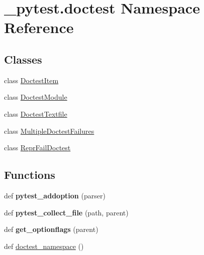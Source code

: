 \hypertarget{namespace__pytest_1_1doctest}{}\section{\+\_\+pytest.\+doctest Namespace Reference}
\label{namespace__pytest_1_1doctest}
\subsection*{Classes}
\begin{DoxyCompactItemize}
\item 
class \hyperlink{class__pytest_1_1doctest_1_1_doctest_item}{Doctest\+Item}
\item 
class \hyperlink{class__pytest_1_1doctest_1_1_doctest_module}{Doctest\+Module}
\item 
class \hyperlink{class__pytest_1_1doctest_1_1_doctest_textfile}{Doctest\+Textfile}
\item 
class \hyperlink{class__pytest_1_1doctest_1_1_multiple_doctest_failures}{Multiple\+Doctest\+Failures}
\item 
class \hyperlink{class__pytest_1_1doctest_1_1_repr_fail_doctest}{Repr\+Fail\+Doctest}
\end{DoxyCompactItemize}
\subsection*{Functions}
\begin{DoxyCompactItemize}
\item 
\mbox{\label{namespace__pytest_1_1doctest_a033cf61ee7c1c00bf68e10e290868006}} 
def {\bfseries pytest\+\_\+addoption} (parser)
\item 
\mbox{\label{namespace__pytest_1_1doctest_ad0bbd0800646e5b301ed36044b3e6a9b}} 
def {\bfseries pytest\+\_\+collect\+\_\+file} (path, parent)
\item 
\mbox{\label{namespace__pytest_1_1doctest_ac79ad01bec1de8666bdc2f46a21c9162}} 
def {\bfseries get\+\_\+optionflags} (parent)
\item 
def \hyperlink{namespace__pytest_1_1doctest_a6a8633c7d28b7ed28a31a5d5bf17c361}{doctest\+\_\+namespace} ()
\end{DoxyCompactItemize}
